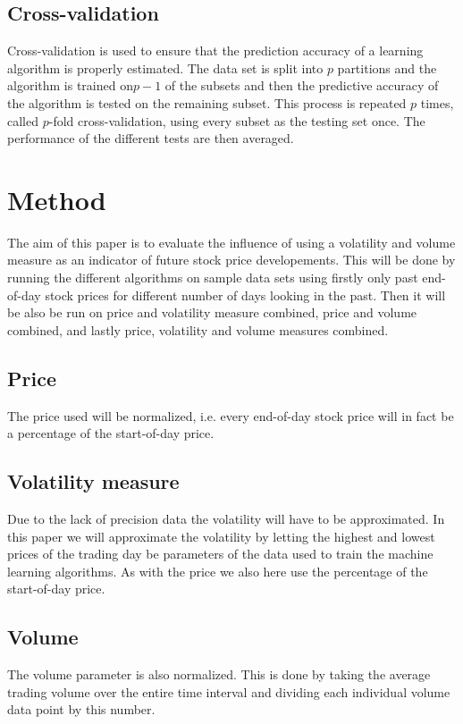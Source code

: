 \documentclass{article}
\begin{document}
\subsection{Cross-validation}
Cross-validation is used to ensure that the prediction accuracy of a learning algorithm is properly estimated. The data set is split into $p$ partitions and the algorithm is trained on$p-1$ of the subsets and then the predictive accuracy of the algorithm is tested on the remaining subset. This process is repeated $p$ times, called $p$-fold cross-validation, using every subset as the testing set once. The performance of the different tests are then averaged.

\newpage

\section{Method}
The aim of this paper is to evaluate the influence of using a volatility and volume measure as an indicator of future stock price developements. This will be done by running the different algorithms on sample data sets using firstly only past end-of-day stock prices for different number of days looking in the past. Then it will be also be run on price and volatility measure combined, price and volume combined, and lastly price, volatility and volume measures combined. 

\subsection{Price}
The price used will be normalized, i.e. every end-of-day stock price will in fact be a percentage of the start-of-day price.

\subsection{Volatility measure}
Due to the lack of precision data the volatility will have to be approximated. In this paper we will approximate the volatility by letting the highest and lowest prices of the trading day be parameters of the data used to train the machine learning algorithms. As with the price we also here use the percentage of the start-of-day price.

\subsection{Volume}
The volume parameter is also normalized. This is done by taking the average trading volume over the entire time interval and dividing each individual volume data point by this number. 
\end{document}
